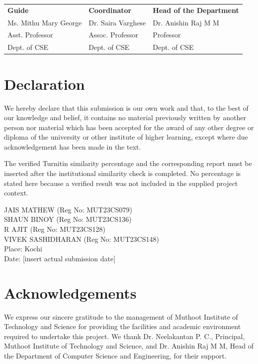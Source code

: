 \documentclass[12pt,a4paper]{report}
\begin{document}
\vspace{2.4cm}
\begin{center}
\begin{tabular}{p{} p{} p{}}
\textbf{Guide} & \textbf{Coordinator} & \textbf{Head of the Department} \\
Ms. Mithu Mary George & Dr. Saira Varghese & Dr. Anishin Raj M M \\
Asst. Professor & Assoc. Professor & Professor \\
Dept. of CSE & Dept. of CSE & Dept. of CSE
\end{tabular}
\end{center}

\newpage
\chapter*{Declaration}
We hereby declare that this submission is our own work and that, to the best of our knowledge and belief, it contains no material previously written by another person nor material which has been accepted for the award of any other degree or diploma of the university or other institute of higher learning, except where due acknowledgement has been made in the text.

The verified Turnitin similarity percentage and the corresponding report must be inserted after the institutional similarity check is completed. No percentage is stated here because a verified result was not included in the supplied project context.

\vspace{1.2cm}
\noindent JAIS MATHEW (Reg No: MUT23CS079) \\
SHAUN BINOY (Reg No: MUT23CS136) \\
R AJIT (Reg No: MUT23CS128) \\
VIVEK SASHIDHARAN (Reg No: MUT23CS148) \\
\vspace{1cm}
\noindent Place: Kochi \\
Date: [insert actual submission date]

\newpage
\chapter*{Acknowledgements}
We express our sincere gratitude to the management of Muthoot Institute of Technology and Science for providing the facilities and academic environment required to undertake this project. We thank Dr. Neelakantan P. C., Principal, Muthoot Institute of Technology and Science, and Dr. Anishin Raj M M, Head of the Department of Computer Science and Engineering, for their support.
\end{document}

